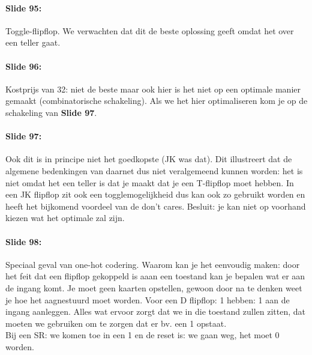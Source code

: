 \documentclass[10pt,a4paper]{book}
\begin{document}
\paragraph{Slide 95:} Toggle-flipflop. We verwachten dat dit de beste oplossing geeft omdat het over een teller gaat. 

\paragraph{Slide 96:} Kostprijs van 32: niet de beste maar ook hier is het niet op een optimale manier gemaakt (combinatorische schakeling). Als we het hier optimaliseren kom je op de schakeling van \textbf{Slide 97}.

\paragraph{Slide 97:} Ook dit is in principe niet het goedkopste (JK was dat). Dit illustreert dat de algemene bedenkingen van daarnet dus niet veralgemeend kunnen worden: het is niet omdat het een teller is dat je maakt dat je een T-flipflop moet hebben. In een JK flipflop zit ook een togglemogelijkheid dus kan ook zo gebruikt worden en heeft het bijkomend voordeel van de don't cares. Besluit: je kan niet op voorhand kiezen wat het optimale zal zijn.

\paragraph{Slide 98:} Speciaal geval van one-hot codering. Waarom kan je het eenvoudig maken: door het feit dat een flipflop gekoppeld is aaan een toestand kan je bepalen wat er aan de ingang komt. Je moet geen kaarten opstellen, gewoon door na te denken weet je hoe het aagnestuurd moet worden. Voor een D flipflop: 1 hebben: 1 aan de ingang aanleggen. Alles wat ervoor zorgt dat we in die toestand zullen zitten, dat moeten we gebruiken om te zorgen dat er bv. een 1 opstaat.\\
Bij een SR: we komen toe in een 1 en de reset is: we gaan weg, het moet 0 worden.
\end{document}
